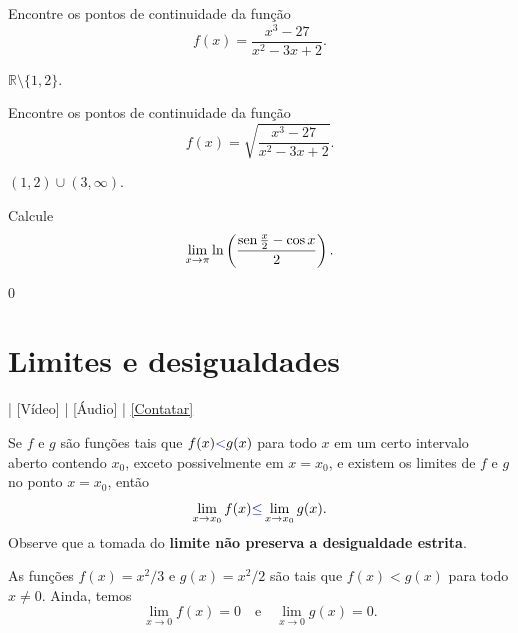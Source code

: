 \begin{exer}
  Encontre os pontos de continuidade da função
  \begin{equation}
    f(x) = \frac{x^3 - 27}{x^2 - 3x + 2}.
  \end{equation}
\end{exer}
\begin{resp}
  $\mathbb{R}\setminus\{1,2\}$.
\end{resp}

\begin{exer}
  Encontre os pontos de continuidade da função
  \begin{equation}
    f(x) = \sqrt{\frac{x^3 - 27}{x^2 - 3x + 2}}.
  \end{equation}
\end{exer}
\begin{resp}
  $(1, 2)\cup (3, \infty)$.
\end{resp}

\begin{exer}
  Calcule
  \begin{equation}
    \lim_{x\to \pi} \ln \left(\frac{\operatorname{sen} \frac{x}{2} - \cos x}{2}\right).
  \end{equation}
\end{exer}
\begin{resp}
  $0$
\end{resp}

\section{Limites e desigualdades}\label{cap_lim_sec_limdes}

\begin{flushright}
  [YouTube] | [Vídeo] | [Áudio] | \href{https://phkonzen.github.io/notas/contato.html}{[Contatar]}
\end{flushright}

Se $f$ e $g$ são funções tais que $f(x){\color{blue}<}g(x)$ para todo $x$ em um certo intervalo aberto contendo $x_0$, exceto possivelmente em $x=x_0$, e existem os limites de $f$ e $g$ no ponto $x=x_0$, então
\begin{equation}
  \lim_{x\to x_0} f(x) {\color{blue}\leq} \lim_{x\to x_0} g(x).
\end{equation}
Observe que a tomada do {\bf limite não preserva a desigualdade estrita}.

\begin{ex}
  As funções $f(x) = x^2/3$ e $g(x) = x^2/2$ são tais que $f(x) < g(x)$ para todo $x\neq 0$. Ainda, temos
  \begin{equation}
    \lim_{x\to 0} f(x) = 0\quad\text{e}\quad\lim_{x\to 0} g(x) = 0.
  \end{equation}
\end{ex}

